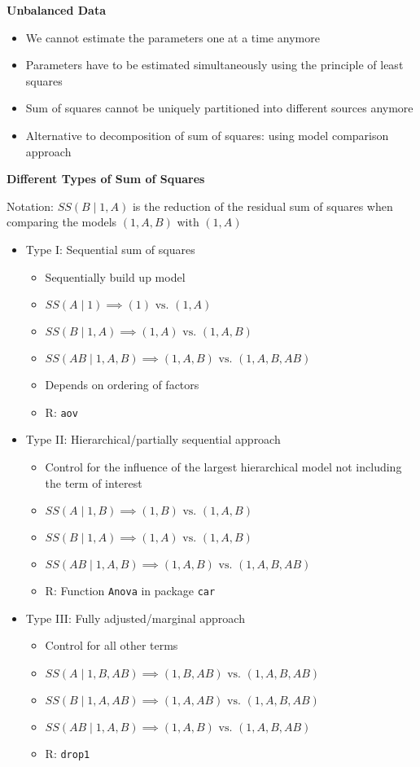 \documentclass[a4paper]{article}
\begin{document}
\textbf{Unbalanced Data}
\begin{itemize}
    \item We cannot estimate the parameters one at a time anymore
    \item Parameters have to be estimated simultaneously using the principle of least squares
    \item Sum of squares cannot be uniquely partitioned into different sources anymore
    \item Alternative to decomposition of sum of squares: using model comparison approach
\end{itemize}

\textbf{Different Types of Sum of Squares}

Notation: $SS(B\mid 1,A)$ is the reduction of the residual sum of squares when comparing the models $(1,A,B)$ with $(1,A)$
\begin{itemize}
    \item Type I: Sequential sum of squares
    \begin{itemize}
        \item Sequentially build up model
        \item $SS(A\mid 1)\implies (1) \textrm{ vs. } (1,A)$
        \item $SS(B\mid 1,A)\implies (1,A) \textrm{ vs. } (1,A,B)$
        \item $SS(AB\mid 1,A,B)\implies (1,A,B) \textrm{ vs. } (1,A,B,AB)$
        \item Depends on ordering of factors
        \item R: \texttt{aov}
    \end{itemize}
    \item Type II: Hierarchical/partially sequential approach
    \begin{itemize}
        \item Control for the influence of the largest hierarchical model not including the term of interest
        \item $SS(A\mid 1,B)\implies (1,B) \textrm{ vs. } (1,A,B)$
        \item $SS(B\mid 1,A)\implies (1,A) \textrm{ vs. } (1,A,B)$
        \item $SS(AB\mid 1,A,B)\implies (1,A,B) \textrm{ vs. } (1,A,B,AB)$
        \item R: Function \texttt{Anova} in package \texttt{car}
    \end{itemize}
    \item Type III: Fully adjusted/marginal approach
    \begin{itemize}
        \item Control for all other terms
        \item $SS(A\mid 1,B,AB)\implies (1,B,AB) \textrm{ vs. } (1,A,B,AB)$
        \item $SS(B\mid 1,A,AB)\implies (1,A,AB) \textrm{ vs. } (1,A,B,AB)$
        \item $SS(AB\mid 1,A,B)\implies (1,A,B) \textrm{ vs. } (1,A,B,AB)$
        \item R: \texttt{drop1}
    \end{itemize}
\end{itemize}
\end{document}

